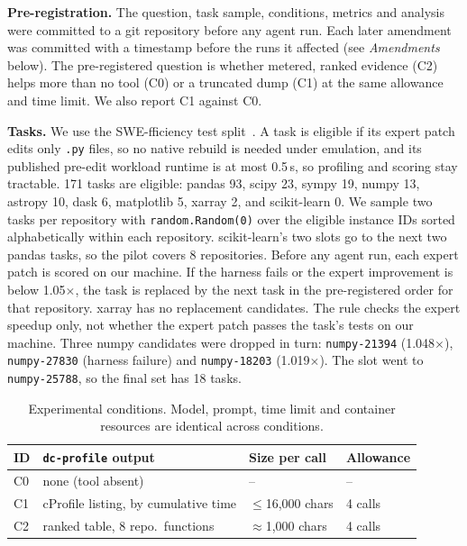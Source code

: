 \documentclass[conference]{IEEEtran}
\newcommand{\tool}{\texttt{dc-profile}}
\begin{document}
\textbf{Pre-registration.} The question, task sample, conditions, metrics and
analysis were committed to a git repository before any agent run. Each later
amendment was committed with a timestamp before the runs it affected (see
\emph{Amendments} below). The pre-registered question is whether metered,
ranked evidence (C2) helps more than no tool (C0) or a truncated dump (C1) at
the same allowance and time limit. We also report C1 against C0.

\textbf{Tasks.} We use the SWE-fficiency test split~\cite{ma2025swefficiency}. A
task is eligible if its expert patch edits only \texttt{.py} files, so no
native rebuild is needed under emulation, and its published pre-edit workload
runtime is at most 0.5\,s, so profiling and scoring stay tractable. 171 tasks
are eligible: pandas 93, scipy 23, sympy 19, numpy 13, astropy 10, dask 6,
matplotlib 5, xarray 2, and scikit-learn 0. We sample two tasks per repository
with \texttt{random.Random(0)} over the eligible instance IDs sorted
alphabetically within each repository. scikit-learn's two slots go to the
next two pandas tasks, so the pilot covers 8 repositories. Before any agent
run, each expert patch is scored on our machine. If the harness fails or the
expert improvement is below 1.05$\times$, the task is replaced by the next
task in the pre-registered order for that repository. xarray has no
replacement candidates. The rule checks the expert speedup only, not whether
the expert patch passes the task's tests on our machine. Three numpy
candidates were dropped in turn: \texttt{numpy-21394} (1.048$\times$),
\texttt{numpy-27830} (harness failure) and \texttt{numpy-18203}
(1.019$\times$). The slot went to \texttt{numpy-25788}, so the final set has 18
tasks.

\begin{table}[t]
\caption{Experimental conditions. Model, prompt, time limit and container
resources are identical across conditions.}
\label{tab:conditions}
\centering
\footnotesize
\setlength{\tabcolsep}{3pt}
\begin{tabular}{@{}llll@{}}
\toprule
ID & \tool{} output & Size per call & Allowance \\
\midrule
C0 & none (tool absent) & -- & -- \\
C1 & cProfile listing, by cumulative time & $\le$16{,}000 chars & 4 calls \\
C2 & ranked table, 8 repo.\ functions & $\approx$1{,}000 chars & 4 calls \\
\bottomrule
\end{tabular}
\end{table}
\end{document}
